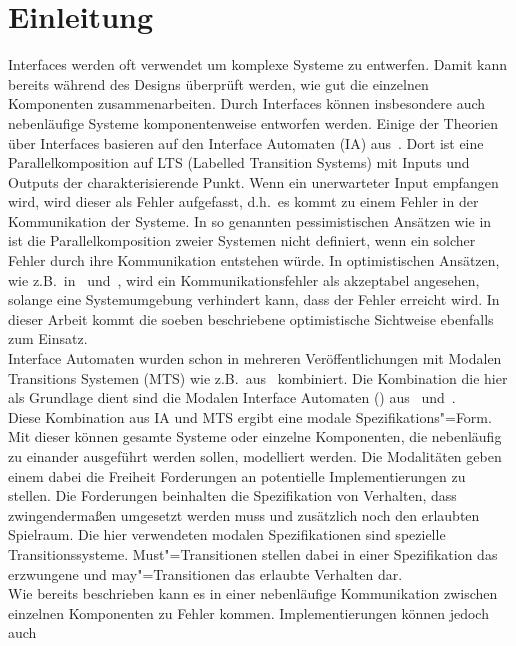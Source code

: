 \chapter{Einleitung}

Interfaces werden oft verwendet um komplexe Systeme zu entwerfen. Damit kann
bereits während des Designs überprüft werden, wie gut die einzelnen Komponenten
zusammenarbeiten. Durch Interfaces können insbesondere auch nebenläufige
Systeme komponentenweise entworfen werden. Einige der Theorien über Interfaces
basieren auf den Interface Automaten (IA) aus~\cite{Alfaro2004}. Dort ist eine
Parallelkomposition auf LTS (Labelled Transition Systems) mit Inputs und
Outputs der charakterisierende Punkt. Wenn ein unerwarteter Input empfangen
wird, wird dieser als Fehler aufgefasst, d.h.\ es kommt zu einem Fehler in der
Kommunikation der Systeme. In so genannten pessimistischen Ansätzen wie
in~\cite{Bauer2010} ist die Parallelkomposition zweier Systemen nicht
definiert, wenn ein solcher Fehler durch ihre Kommunikation entstehen würde. In
optimistischen Ansätzen, wie z.B.\ in~\cite{Luttgen2013MIA1}
und~\cite{Vogler2016MIA3}, wird ein Kommunikationsfehler als akzeptabel
angesehen, solange eine Systemumgebung verhindert kann, dass der Fehler
erreicht wird. In dieser Arbeit kommt die soeben beschriebene optimistische
Sichtweise ebenfalls zum Einsatz.\\
Interface Automaten wurden schon in mehreren Veröffentlichungen mit Modalen
Transitions Systemen (MTS) wie z.B.\ aus~\cite{Larsen1989} kombiniert. Die
Kombination die hier als Grundlage dient sind die Modalen Interface Automaten
(\MIA{}) aus~\cite{Luttgen2013MIA1} und~\cite{Vogler2016MIA3}.\\
Diese Kombination aus IA und MTS ergibt eine modale Spezifikations"=Form. Mit
dieser können gesamte Systeme oder einzelne Komponenten, die nebenläufig zu
einander ausgeführt werden sollen, modelliert werden. Die Modalitäten geben
einem dabei die Freiheit Forderungen an potentielle Implementierungen zu
stellen. Die Forderungen beinhalten die Spezifikation von Verhalten, dass
zwingendermaßen umgesetzt werden muss und zusätzlich noch den erlaubten
Spielraum. Die hier verwendeten modalen Spezifikationen sind spezielle
Transitionssysteme. Must"=Transitionen stellen dabei in einer Spezifikation das
erzwungene und may"=Transitionen das erlaubte Verhalten dar.\\
Wie bereits beschrieben kann es in einer nebenläufige Kommunikation zwischen
einzelnen Komponenten zu Fehler kommen. Implementierungen können jedoch auch
